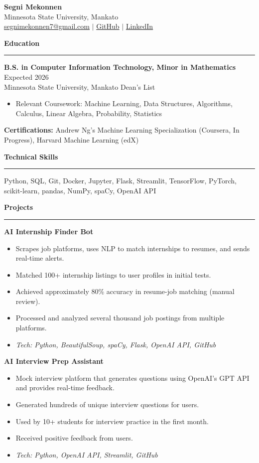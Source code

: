 \documentclass[a4paper,10pt]{article}
\newcommand{\resumeItem}[1]{\item #1}
\newcommand{\resumeSubheading}[4]{
  \textbf{#1} \hfill #2 \\
  #3 \hfill #4 \\
}
\newcommand{\resumeSection}[1]{\vspace{6pt}\textbf{\large #1}\vspace{2pt}\hrule\vspace{4pt}}
\begin{document}
\begin{center}
  {\LARGE \textbf{Segni Mekonnen}} \\[2pt]
  Minnesota State University, Mankato \\[2pt]
  \href{mailto:segnimekonnen7@gmail.com}{segnimekonnen7@gmail.com} $\vert$ 
  \href{https://github.com/segnimekonnen7}{GitHub} $\vert$ 
  \href{https://www.linkedin.com/in/segni-mekonnen-16928125b}{LinkedIn}
\end{center}

\resumeSection{Education}
\resumeSubheading{B.S. in Computer Information Technology, Minor in Mathematics}{Expected 2026}{Minnesota State University, Mankato}{Dean's List}
\begin{itemize}[leftmargin=*, noitemsep]
  \resumeItem{Relevant Coursework: Machine Learning, Data Structures, Algorithms, Calculus, Linear Algebra, Probability, Statistics}
\end{itemize}
\textbf{Certifications:} Andrew Ng's Machine Learning Specialization (Coursera, In Progress), Harvard Machine Learning (edX)

\resumeSection{Technical Skills}
Python, SQL, Git, Docker, Jupyter, Flask, Streamlit, TensorFlow, PyTorch, scikit-learn, pandas, NumPy, spaCy, OpenAI API

\resumeSection{Projects}
\textbf{AI Internship Finder Bot} \\[-2pt]
\begin{itemize}[leftmargin=*, noitemsep]
  \resumeItem{Scrapes job platforms, uses NLP to match internships to resumes, and sends real-time alerts.}
  \resumeItem{Matched 100+ internship listings to user profiles in initial tests.}
  \resumeItem{Achieved approximately 80\% accuracy in resume-job matching (manual review).}
  \resumeItem{Processed and analyzed several thousand job postings from multiple platforms.}
  \resumeItem{\textit{Tech: Python, BeautifulSoup, spaCy, Flask, OpenAI API, GitHub}}
\end{itemize}

\textbf{AI Interview Prep Assistant} \\[-2pt]
\begin{itemize}[leftmargin=*, noitemsep]
  \resumeItem{Mock interview platform that generates questions using OpenAI’s GPT API and provides real-time feedback.}
  \resumeItem{Generated hundreds of unique interview questions for users.}
  \resumeItem{Used by 10+ students for interview practice in the first month.}
  \resumeItem{Received positive feedback from users.}
  \resumeItem{\textit{Tech: Python, OpenAI API, Streamlit, GitHub}}
\end{itemize}
\end{document}
